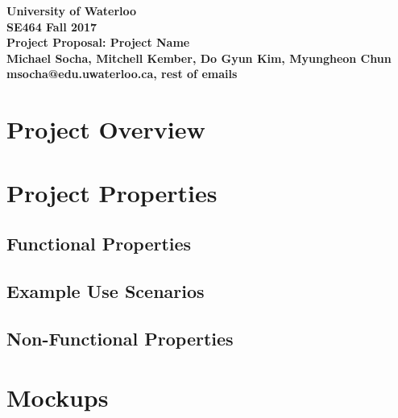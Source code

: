 \documentclass[12pt]{article}
\begin{document}
\begin{center}
\vspace*{\fill}
{\Large\bf University of Waterloo}\\
\vspace{3mm}
{\Large\bf SE464 Fall 2017}\\
\vspace{3mm}
{\large\bf Project Proposal: Project Name}\\
\vspace{3mm}
{\large\bf Michael Socha, Mitchell Kember, Do Gyun Kim, Myungheon Chun}\\
\vspace{3mm}
{\large\bf msocha@edu.uwaterloo.ca, rest of emails}\\
\vspace*{\fill}
\end{center}

\newpage

\section{Project Overview}

\newpage

\section{Project Properties}
\subsection{Functional Properties}
\subsection{Example Use Scenarios}
\subsection{Non-Functional Properties}

\newpage

\section{Mockups}
\end{document}
